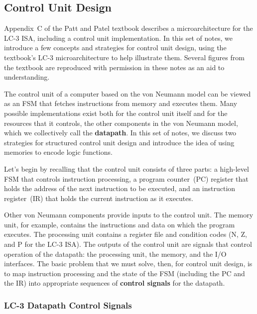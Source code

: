\classtitle

\subsection{Control Unit Design}

Appendix~C of the Patt and Patel textbook describes a microarchitecture for
the LC-3 ISA, including a control unit implementation.
%
In this set of notes, we introduce a few concepts and strategies for
control unit design, using the textbook's \mbox{LC-3} microarchitecture 
to help illustrate them.  Several figures from the textbook are
reproduced with permission in these notes as an aid to understanding.

The control unit of a computer based on the von Neumann model can be viewed
as an FSM that fetches instructions from memory and executes them.  Many
possible implementations exist both for the control unit itself and for the
resources that it controls, the other components in the von Neumann model,
which we collectively call the {\bf datapath}.
%
In this set of notes, we discuss two strategies for structured control
unit design and introduce the idea of using memories to encode logic 
functions.

Let's begin by recalling that the control unit consists of three parts: a 
high-level FSM that controls instruction processing, a program counter~(PC)
register that holds the address of the next instruction to be executed,
and an instruction register~(IR) that holds the current instruction as
it executes.

Other von Neumann components provide inputs to the control unit.  The
memory unit, for example, contains the instructions and data on which 
the program executes.  
%
The processing unit contains a register file and condition 
codes (N, Z, and P for the \mbox{LC-3} ISA).  
%
The outputs of the control unit are signals that control operation of the
datapath: the processing unit, the memory, and the I/O interfaces.
%
The basic problem that we must solve, then, for control unit design, is to 
map instruction processing and the state of the FSM (including the PC and
the IR) into appropriate sequences of {\bf control signals} for the datapath.\\

\subsubsection{LC-3 Datapath Control Signals}

